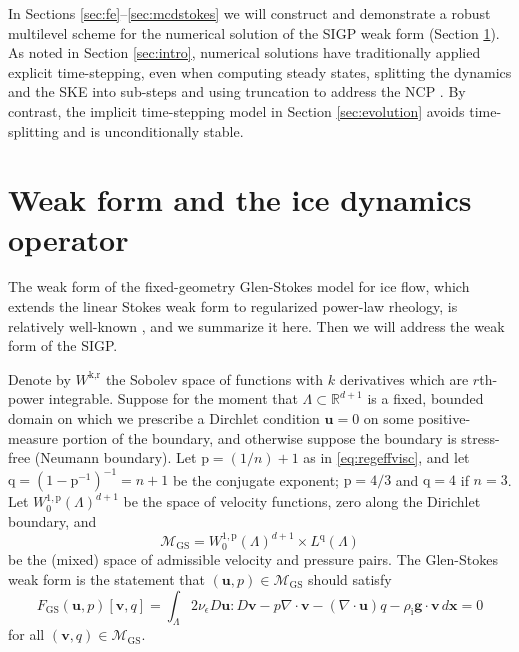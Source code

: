 \documentclass[letterpaper,final,12pt,reqno]{amsart}
\theoremstyle{claim}
\newcommand{\eps}{\epsilon}
\newcommand{\RR}{\mathbb{R}}
\newcommand{\Div}{\nabla\cdot}
\newcommand{\bg}{\mathbf{g}}
\newcommand{\bu}{\mathbf{u}}
\newcommand{\bv}{\mathbf{v}}
\newcommand{\bx}{\mathbf{x}}
\newcommand{\rhoi}{\rho_{\text{i}}}
\newcommand{\pp}{{\text{p}}}
\newcommand{\qq}{{\text{q}}}
\numberwithin{equation}{section}
\numberwithin{figure}{section}
\numberwithin{table}{section}
\numberwithin{theorem}{section}
\begin{document}
In Sections \ref{sec:fe}--\ref{sec:mcdstokes} we will construct and demonstrate a robust multilevel scheme for the numerical solution of the SIGP weak form (Section \ref{sec:weakido}).  As noted in Section \ref{sec:intro}, numerical solutions have traditionally applied explicit time-stepping, even when computing steady states, splitting the dynamics and the SKE into sub-steps and using truncation to address the NCP \cite[for example]{Jouvetetal2008,Lengetal2012}.  By contrast, the implicit time-stepping model in Section \ref{sec:evolution} avoids time-splitting and is unconditionally stable.


\section{Weak form and the ice dynamics operator} \label{sec:weakido}

The weak form of the fixed-geometry Glen-Stokes model for ice flow, which extends the linear Stokes weak form \cite{Elmanetal2014} to regularized power-law rheology, is relatively well-known \cite{IsaacStadlerGhattas2015,JouvetRappaz2011,Lengetal2012}, and we summarize it here.  Then we will address the weak form of the SIGP.

Denote by $W^{\text{k},\text{r}}$ the Sobolev space \cite{Evans2010} of functions with $k$ derivatives which are $r$th-power integrable.  Suppose for the moment that $\Lambda \subset \RR^{d+1}$ is a fixed, bounded domain on which we prescribe a Dirchlet condition $\bu=0$ on some positive-measure portion of the boundary, and otherwise suppose the boundary is stress-free (Neumann boundary).  Let $\pp=(1/n)+1$ as in \eqref{eq:regeffvisc}, and let $\qq=(1-\pp^{-1})^{-1}=n+1$ be the conjugate exponent; $\pp=4/3$ and $\qq = 4$ if $n=3$.  Let $W_0^{1,\pp}(\Lambda)^{d+1}$ be the space of velocity functions, zero along the Dirichlet boundary, and
\begin{equation}
\mathcal{M}_{\text{GS}} = W_0^{1,\pp}(\Lambda)^{d+1} \times L^\qq(\Lambda)  \label{eq:mixed}
\end{equation}
be the (mixed) space of admissible velocity and pressure pairs.  The Glen-Stokes weak form is the statement that $(\bu,p) \in \mathcal{M}_{\text{GS}}$ should satisfy
\begin{equation}
F_{\text{GS}}(\bu,p)[\bv,q] = \int_\Lambda 2 \nu_\eps D\bu : D\bv - p \Div\bv - (\Div\bu) q - \rhoi \bg \cdot \bv\,d\bx = 0 \label{eq:glenstokesweak}
\end{equation}
for all $(\bv,q) \in \mathcal{M}_{\text{GS}}$.
\end{document}
